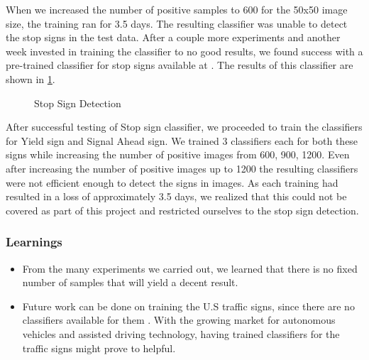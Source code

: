 \documentclass[9pt,twocolumn,twoside]{../../styles/osajnl}
\begin{document}
When we increased the number of positive samples to 600 for the 50x50 image size, the training ran for 3.5 days. The resulting classifier was unable to detect the stop signs in the test data. After a couple more experiments and another week invested in training the classifier to no good results, we found success with a pre-trained classifier for stop signs available at \cite{github-stopsigns}. The results of this classifier are shown in \ref{fig:detect}.

\begin{figure}[htbp]
\centering
{}
\caption{Stop Sign Detection}
\label{fig:detect}
\end{figure}

After successful testing of Stop sign classifier, we proceeded to train the classifiers for Yield sign and Signal Ahead sign. We trained 3 classifiers each for both these signs while increasing the number of positive images from 600, 900, 1200. Even after increasing the number of positive images up to 1200 the resulting classifiers were not efficient enough to detect the signs in images.
As each training had resulted in a loss of approximately 3.5 days,  we realized that this could not be covered as part of this project and restricted ourselves to the stop sign detection. 
\subsubsection{Learnings}
\begin{itemize}
\item From the many experiments we carried out, we learned that there is no fixed number of samples that will yield a decent result. 
\item Future work can be done on training the U.S traffic signs, since there are no classifiers available for them . With the growing market for autonomous vehicles and assisted driving technology, having trained classifiers for the traffic signs might prove to helpful.
\end{itemize}
\end{document}
